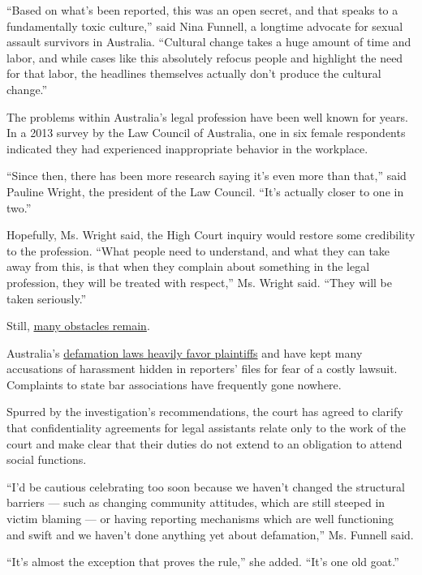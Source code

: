 ``Based on what's been reported, this was an open secret, and that
speaks to a fundamentally toxic culture,'' said Nina Funnell, a longtime
advocate for sexual assault survivors in Australia. ``Cultural change
takes a huge amount of time and labor, and while cases like this
absolutely refocus people and highlight the need for that labor, the
headlines themselves actually don't produce the cultural change.''

The problems within Australia's legal profession have been well known
for years. In a 2013 survey by the Law Council of Australia, one in six
female respondents indicated they had experienced inappropriate behavior
in the workplace.

``Since then, there has been more research saying it's even more than
that,'' said Pauline Wright, the president of the Law Council. ``It's
actually closer to one in two.''

Hopefully, Ms. Wright said, the High Court inquiry would restore some
credibility to the profession. ``What people need to understand, and
what they can take away from this, is that when they complain about
something in the legal profession, they will be treated with respect,''
Ms. Wright said. ``They will be taken seriously.''

Still,
\href{https://www.nytimes3xbfgragh.onion/2019/05/01/business/australia-sexual-harassment-nondisclosure-agreement.html}{many
obstacles remain}.

Australia's
\href{https://www.nytimes3xbfgragh.onion/2019/06/05/world/australia/journalist-raids.html}{defamation
laws heavily favor plaintiffs} and have kept many accusations of
harassment hidden in reporters' files for fear of a costly lawsuit.
Complaints to state bar associations have frequently gone nowhere.

Spurred by the investigation's recommendations, the court has agreed to
clarify that confidentiality agreements for legal assistants relate only
to the work of the court and make clear that their duties do not extend
to an obligation to attend social functions.

``I'd be cautious celebrating too soon because we haven't changed the
structural barriers --- such as changing community attitudes, which are
still steeped in victim blaming --- or having reporting mechanisms which
are well functioning and swift and we haven't done anything yet about
defamation,'' Ms. Funnell said.

``It's almost the exception that proves the rule,'' she added. ``It's
one old goat.''

